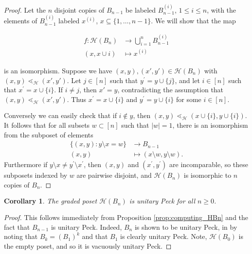 \documentclass[smallextended, envcountsame, numbook]{svjour3}
\theoremstyle{plain}
\newtheorem{cor}[thm]{Corollary}
\theoremstyle{definition}
\theoremstyle{remark}
\numberwithin{equation}{section}
\begin{document}
\begin{proof}
Let the $n$ disjoint copies of $B_{n-1}$ be labeled $B_{n-1}^{(i)}$, $1\le i\le n$, with the elements of $B_{n-1}^{(i)}$ labeled $x^{(i)}$, $x\subseteq \{1,\ldots,n-1\}$.  We will show that the map 

\begin{align*}
f\colon \mathcal{H}(B_n) &\longrightarrow \bigcup_{i=1}^n B_{n-1}^{(i)}\\
(x,x\cup{i})&\longmapsto x^{(i)}
\end{align*}

\noindent is an isomorphism.  Suppose we have $(x, y),(x', y') \in \mathcal H(B_n)$ with $(x, y) \lessdot_{\mathcal H} (x', y')$. Let $j\in [n]$ such that $y^\prime = y\cup\{j\}$, and let $i\in [n]$ such that $x^\prime = x\cup \{i\}$. If $i \ne j$, then $x' = y$, contradicting the assumption that $(x, y) \lessdot_{\mathcal H} (x', y')$. Thus $x^\prime = x\cup\{i\}$ and $y^\prime = y\cup\{i\}$ for some $i\in [n]$.

Conversely we can easily check that if $i\not\in y$, then $(x, y)\lessdot_{\mathcal{H}} (x\cup\{i\}, y\cup\{i\})$.  It follows that for all subsets $w \subset [n]$ such that $|w| = 1$, there is an isomorphism from the subposet of elements 
\begin{align*}
\{(x, y)\colon y\setminus x = w\} & \rightarrow B_{n-1}\\
(x,y) &\mapsto (x\setminus w,y\setminus w). 
\end{align*}
Furthermore if $y\setminus x \ne y^\prime \setminus x^\prime$, then $(x, y)$ and $(x^\prime, y^\prime)$ are incomparable, so these subposets indexed by $w$ are pairwise disjoint, and $\mathcal H(B_n)$ is isomorphic to $n$ copies of $B_{n}$.
\end{proof}

\begin{cor}\label{cor:HBn_unitary_peck}
The graded poset 
$\mathcal H(B_n)$ is unitary Peck for all $n\ge 0$.
\end{cor}

\begin{proof}
This follows immediately from Proposition \ref{prop:computing_HBn} and the fact that $B_{n-1}$ is unitary Peck.  Indeed, $B_n$ is shown to be unitary Peck, in \cite[Theorem 2a]{quotients_stanley} by noting that $B_k = (B_1)^k$ and that $B_1$ is clearly unitary Peck.
Note, $\mathcal H(B_0)$ is the empty poset, and so it is vacuously unitary Peck.
\end{proof}
\end{document}
